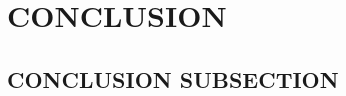 \documentclass[../main/main.tex]{subfiles}
\begin{document}
\section{CONCLUSION}

\subsection{CONCLUSION SUBSECTION}
\end{document}
